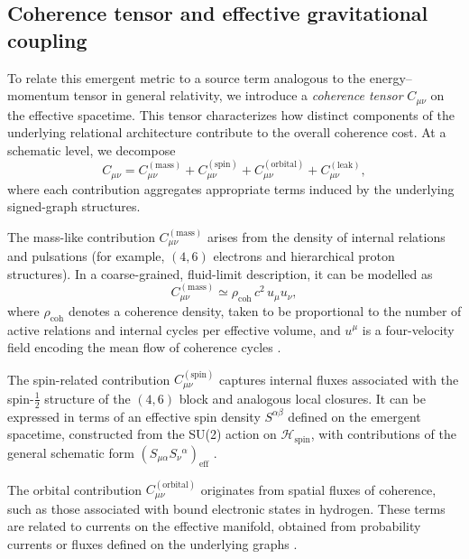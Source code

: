 \documentclass[11pt,a4paper]{article}
\theoremstyle{definition}
\newcommand{\Hspin}{\mathcal{H}_{\mathrm{spin}}}
\newcommand{\Ccoh}{C_{\mu\nu}} %
\begin{document}
\subsection{Coherence tensor and effective gravitational coupling}

To relate this emergent metric to a source term analogous to the energy–momentum tensor in general relativity, we introduce a \emph{coherence tensor} $\Ccoh$ on the effective spacetime. This tensor characterizes how distinct components of the underlying relational architecture contribute to the overall coherence cost. At a schematic level, we decompose
\[
\Ccoh = C_{\mu\nu}^{(\mathrm{mass})} + C_{\mu\nu}^{(\mathrm{spin})} + C_{\mu\nu}^{(\mathrm{orbital})} + C_{\mu\nu}^{(\mathrm{leak})},
\]
where each contribution aggregates appropriate terms induced by the underlying signed-graph structures. 

The mass-like contribution $C_{\mu\nu}^{(\mathrm{mass})}$ arises from the density of internal relations and pulsations (for example, $(4,6)$ electrons and hierarchical proton structures). In a coarse-grained, fluid-limit description, it can be modelled as
\[
C_{\mu\nu}^{(\mathrm{mass})} \simeq \rho_{\mathrm{coh}}\,c^2\,u_\mu u_\nu,
\]
where $\rho_{\mathrm{coh}}$ denotes a coherence density, taken to be proportional to the number of active relations and internal cycles per effective volume, and $u^\mu$ is a four-velocity field encoding the mean flow of coherence cycles \cite{PDL,PDL_Global_Mapping_Structures_Results_Open_Problems}. 

The spin-related contribution $C_{\mu\nu}^{(\mathrm{spin})}$ captures internal fluxes associated with the spin-$\tfrac{1}{2}$ structure of the $(4,6)$ block and analogous local closures. It can be expressed in terms of an effective spin density $S^{\alpha\beta}$ defined on the emergent spacetime, constructed from the SU(2) action on $\Hspin$, with contributions of the general schematic form $(S_{\mu\alpha}S_{\nu}{}^{\alpha})_{\mathrm{eff}}$ \cite{PDL_Global_Mapping_Structures_Results_Open_Problems}. 

The orbital contribution $C_{\mu\nu}^{(\mathrm{orbital})}$ originates from spatial fluxes of coherence, such as those associated with bound electronic states in hydrogen. These terms are related to currents on the effective manifold, obtained from probability currents or fluxes defined on the underlying graphs \cite{Sketch_derivation_Schroedinger_PDL,PDL_Global_Mapping_Structures_Results_Open_Problems}.
\end{document}
